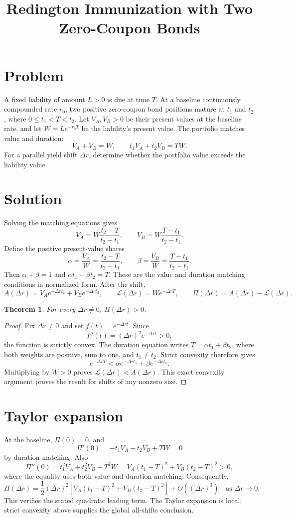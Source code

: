 \documentclass[11pt]{article}
\title{Redington Immunization with Two Zero-Coupon Bonds}
\author{}
\date{}
\newtheorem{theorem}{Theorem}
\begin{document}
\maketitle
\section*{Problem}
A fixed liability of amount \(L>0\) is due at time \(T\). At a baseline continuously compounded rate \(r_0\), two positive zero-coupon bond positions mature at \(t_1\) and \(t_2\), where \(0\le t_1<T<t_2\). Let \(V_A,V_B>0\) be their present values at the baseline rate, and let \(W=L e^{-r_0T}\) be the liability's present value. The portfolio matches value and duration:
\[V_A+V_B=W,\qquad t_1V_A+t_2V_B=TW.\]
For a parallel yield shift \(\Delta r\), determine whether the portfolio value exceeds the liability value.
\section*{Solution}
Solving the matching equations gives
\[V_A=W\frac{t_2-T}{t_2-t_1},\qquad V_B=W\frac{T-t_1}{t_2-t_1}.\]
Define the positive present-value shares
\[\alpha=\frac{V_A}{W}=\frac{t_2-T}{t_2-t_1},\qquad \beta=\frac{V_B}{W}=\frac{T-t_1}{t_2-t_1}.\]
Then \(\alpha+\beta=1\) and \(\alpha t_1+\beta t_2=T\). These are the value and duration matching conditions in normalized form.
After the shift,
\[A(\Delta r)=V_Ae^{-\Delta r t_1}+V_Be^{-\Delta r t_2},\qquad \mathcal L(\Delta r)=We^{-\Delta r T},\qquad \Pi(\Delta r)=A(\Delta r)-\mathcal L(\Delta r).\]
\begin{theorem} For every \(\Delta r\ne0\), \(\Pi(\Delta r)>0\). \end{theorem}
\begin{proof}
Fix \(\Delta r\ne0\) and set \(f(t)=e^{-\Delta r t}\). Since
\[f''(t)=(\Delta r)^2e^{-\Delta r t}>0,\]
the function is strictly convex. The duration equation writes \(T=\alpha t_1+\beta t_2\), where both weights are positive, sum to one, and \(t_1\ne t_2\). Strict convexity therefore gives
\[e^{-\Delta r T}<\alpha e^{-\Delta r t_1}+\beta e^{-\Delta r t_2}.\]
Multiplying by \(W>0\) proves \(\mathcal L(\Delta r)<A(\Delta r)\). This exact convexity argument proves the result for shifts of any nonzero size.
\end{proof}
\section*{Taylor expansion}
At the baseline, \(\Pi(0)=0\), and
\[\Pi'(0)=-t_1V_A-t_2V_B+TW=0\]
by duration matching. Also
\[\Pi''(0)=t_1^2V_A+t_2^2V_B-T^2W=V_A(t_1-T)^2+V_B(t_2-T)^2>0,\]
where the equality uses both value and duration matching. Consequently,
\[\Pi(\Delta r)=\frac12(\Delta r)^2\left[V_A(t_1-T)^2+V_B(t_2-T)^2\right]+O((\Delta r)^3)\quad\text{as }\Delta r\to0.\]
This verifies the stated quadratic leading term. The Taylor expansion is local; strict convexity above supplies the global all-shifts conclusion.
\end{document}
